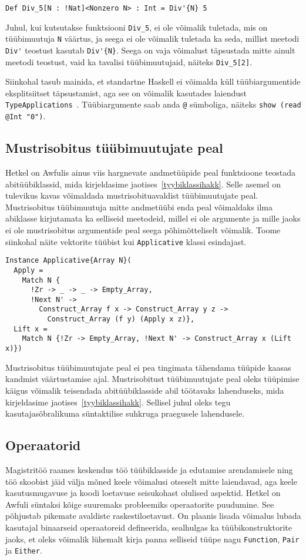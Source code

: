 \documentclass[12pt]{article}
\begin{document}
      \begin{verbatim}Def Div_5[N : !Nat]<Nonzero N> : Int = Div'{N} 5\end{verbatim}

      Juhul, kui kutsutakse funktsiooni \verb!Div_5!, ei ole võimalik tuletada, mis on tüübimuutuja \verb!N! väärtus, ja seega ei ole võimalik tuletada ka seda, millist meetodi \verb!Div'! teostust kasutab \verb!Div'{N}!. Seega on vaja võimalust täpsustada mitte ainult meetodi teostust, vaid ka tavalisi tüübimuutujaid, näiteks \verb!Div_5[2]!.

      Siinkohal tasub mainida, et standartne Haskell ei võimalda küll tüübiargumentide eksplitsiitset täpsustamist, aga see on võimalik kasutades laiendust \verb!TypeApplications!~\cite{Gla}. Tüübiargumente saab anda \verb!@! sümboliga, näiteks \verb!show (read @Int "0")!.
    \subsection{Mustrisobitus tüübimuutujate peal}\label{eemaldadatyybiklassihakk}
      Hetkel on Awfulis ainus viis hargnevate andmetüüpide peal funktsioone teostada abitüübiklassid, mida kirjeldasime jaotises~\ref{tyybiklassihakk}. Selle asemel on tulevikus kavas võimaldada mustrisobituavaldist tüübimuutujate peal. Mustrisobitus tüübimuutuja mitte andmetüübi enda peal võimaldaks ilma abiklasse kirjutamata ka selliseid meetodeid, millel ei ole argumente ja mille jaoks ei ole mustrisobitus argumentide peal seega põhimõtteliselt võimalik. Toome siinkohal näite vektorite tüübist kui \verb!Applicative! klassi esindajast.

      \begin{verbatim}Instance Applicative{Array N}(
  Apply =
    Match N {
      !Zr -> _ -> _ -> Empty_Array,
      !Next N' ->
        Construct_Array f x -> Construct_Array y z ->
          Construct_Array (f y) (Apply x z)},
  Lift x =
    Match N {!Zr -> Empty_Array, !Next N' -> Construct_Array x (Lift x)})\end{verbatim}

      Mustrisobitus tüübimuutujate peal ei pea tingimata tähendama tüüpide kaasas kandmist väärtustamise ajal. Mustrisobitust tüübimuutujate peal oleks tüüpimise käigus võimalik teisendada abitüübiklasside abil töötavaks lahenduseks, mida kirjeldasime jaotises~\ref{tyybiklassihakk}. Sellisel juhul oleks tegu kasutajasõbralikuma süntaktilise suhkruga praegusele lahendusele.
    \subsection{Operaatorid}
      Magistritöö raames keskendus töö tüübiklasside ja edutamise arendamisele ning töö skoobist jäid välja mõned keele võimalusi otseselt mitte laiendavad, aga keele kasutusmugavuse ja koodi loetavuse seisukohast olulised aspektid. Hetkel on Awfuli süntaksi kõige suuremaks probleemiks operaatorite puudumine. See põhjustab pikemate avaldiste raskestiloetavust. On plaanis lisada võimalus lubada kasutajal binaarseid operaatoreid defineerida, sealhulgas ka tüübikonstruktorite jaoks, et oleks võimalik lühemalt kirja panna selliseid tüüpe nagu \verb!Function!, \verb!Pair! ja \verb!Either!.
\end{document}
